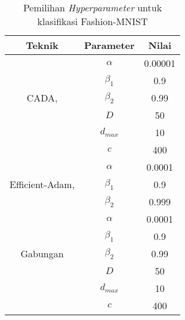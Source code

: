 \begin{table}[H]
  \caption{Pemilihan \emph{Hyperparameter} untuk klasifikasi Fashion-MNIST}\label{hyperparamfashion}
  \centering
  \begin{tabular}{ | c | c | c | }
    \hline
    \textbf{Teknik}                                               & \textbf{Parameter} & \textbf{Nilai} \\
    \hline
    \multirow{5}{*}{CADA, \textcite{Chen2021CADA}}                & $\alpha$           & 0.00001        \\
                                                                  & $\beta_1$          & 0.9            \\
                                                                  & $\beta_2$          & 0.99           \\
                                                                  & $D$                & 50             \\
                                                                  & $d_{max}$          & 10             \\
                                                                  & $c$                & 400            \\
    \hline
    \multirow{3}{*}{Efficient-Adam, \textcite{Chen2022Efficient}} & $\alpha$           & 0.0001         \\
                                                                  & $\beta_1$          & 0.9            \\
                                                                  & $\beta_2$          & 0.999          \\
    \hline
    \multirow{5}{*}{Gabungan}                                     & $\alpha$           & 0.0001         \\
                                                                  & $\beta_1$          & 0.9            \\
                                                                  & $\beta_2$          & 0.99           \\
                                                                  & $D$                & 50             \\
                                                                  & $d_{max}$          & 10             \\
                                                                  & $c$                & 400            \\
    \hline
  \end{tabular}
\end{table}

